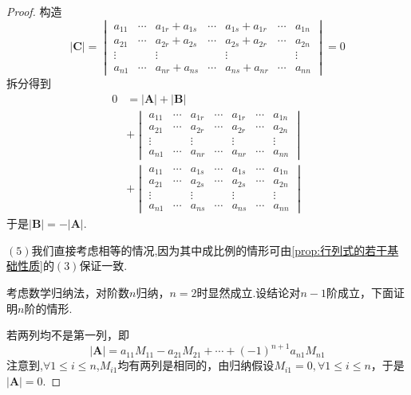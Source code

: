 {\begin{proof}
        构造\[
            \left|\bm{C}\right|=\begin{vmatrix}
                a_{11} & \cdots & a_{1r}+a_{1s} & \cdots & a_{1s}+a_{1r} & \cdots & a_{1n} \\
                a_{21} & \cdots & a_{2r}+a_{2s} & \cdots & a_{2s}+a_{2r} & \cdots & a_{2n} \\
                \vdots &        & \vdots        &        & \vdots        &        & \vdots \\
                a_{n1} & \cdots & a_{nr}+a_{ns} & \cdots & a_{ns}+a_{nr} & \cdots & a_{nn}
            \end{vmatrix}=0
        \]拆分得到
        \begin{align*}
            0 & =\left|\bm{A}\right|+\left|\bm{B}\right|                      \\
              & +\begin{vmatrix}
                     a_{11} & \cdots & a_{1r} & \cdots & a_{1r} & \cdots & a_{1n} \\
                     a_{21} & \cdots & a_{2r} & \cdots & a_{2r} & \cdots & a_{2n} \\
                     \vdots &        & \vdots &        & \vdots &        & \vdots \\
                     a_{n1} & \cdots & a_{nr} & \cdots & a_{nr} & \cdots & a_{nn}
                 \end{vmatrix} \\
              & +\begin{vmatrix}
                     a_{11} & \cdots & a_{1s} & \cdots & a_{1s} & \cdots & a_{1n} \\
                     a_{21} & \cdots & a_{2s} & \cdots & a_{2s} & \cdots & a_{2n} \\
                     \vdots &        & \vdots &        & \vdots &        & \vdots \\
                     a_{n1} & \cdots & a_{ns} & \cdots & a_{ns} & \cdots & a_{nn}
                 \end{vmatrix}
        \end{align*}于是$\left|\bm{B}\right|=-\left|\bm{A}\right|.$

        $(5)$我们直接考虑相等的情况,因为其中成比例的情形可由\cref{prop:行列式的若干基础性质}的$(3)$保证一致.

        考虑数学归纳法，对阶数$n$归纳，$n=2$时显然成立.设结论对$n-1$阶成立，下面证明$n$阶的情形.

        若两列均不是第一列，即\[
            \left|\bm{A}\right|=a_{11}M_{11}-a_{21}M_{21}+\cdots+(-1)^{n+1}a_{n1}M_{n1}
        \]注意到,$\forall 1\leqslant i\leqslant n$,$M_{i1}$均有两列是相同的，由归纳假设$M_{i1}=0,\forall 1\leqslant i\leqslant n$，于是$\left|\bm{A}\right|=0.$


\end{proof}}

